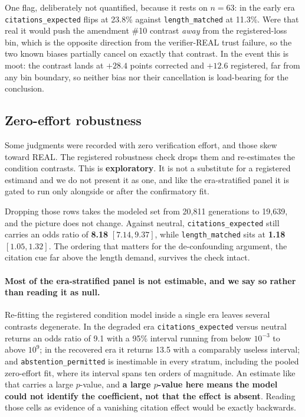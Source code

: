 One flag, deliberately not quantified, because it rests on $n = 63$: in the early
era \texttt{citations\_expected} flips at 23.8\% against \texttt{length\_matched}
at 11.3\%. Were that real it would push the amendment \#10 contrast \emph{away}
from the registered-loss bin, which is the opposite direction from the
verifier-REAL trust failure, so the two known biases partially cancel on exactly
that contrast. In the event this is moot: the contrast lands at $+28.4$ points
corrected and $+12.6$ registered, far from any bin boundary, so neither bias nor
their cancellation is load-bearing for the conclusion.

\subsection{Zero-effort robustness}

Some judgments were recorded with zero verification effort, and those skew toward
REAL. The registered robustness check drops them and re-estimates the condition
contrasts. This is \textbf{exploratory}. It is not a substitute for a registered
estimand and we do not present it as one, and like the era-stratified panel it is
gated to run only alongside or after the confirmatory fit.

Dropping those rows takes the modeled set from 20{,}811 generations to
19{,}639, and the picture does not change. Against neutral,
\texttt{citations\_expected} still carries an odds ratio of \textbf{8.18}
$[7.14, 9.37]$, while \texttt{length\_matched} sits at \textbf{1.18}
$[1.05, 1.32]$. The ordering that matters for the de-confounding argument, the
citation cue far above the length demand, survives the check intact.

\paragraph{Most of the era-stratified panel is not estimable, and we say so
rather than reading it as null.} Re-fitting the registered condition model inside
a single era leaves several contrasts degenerate. In the degraded era
\texttt{citations\_expected} versus neutral returns an odds ratio of 9.1 with a
95\% interval running from below $10^{-3}$ to above $10^{9}$; in the recovered
era it returns 13.5 with a comparably useless interval; and
\texttt{abstention\_permitted} is inestimable in every stratum, including the
pooled zero-effort fit, where its interval spans ten orders of magnitude. An
estimate like that carries a large $p$-value, and \textbf{a large $p$-value here
means the model could not identify the coefficient, not that the effect is
absent}. Reading those cells as evidence of a vanishing citation effect would be
exactly backwards.

